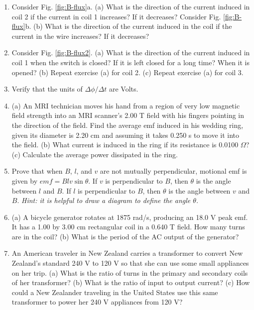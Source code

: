 \documentclass[12pt,twocolumn]{article}
\begin{document}
\noindent
\begin{enumerate}
\item Consider Fig. \ref{fig:B-flux}a.  (a) What is the direction of the current induced in coil 2 if the current in coil 1 increases? If it decreases?  Consider Fig. \ref{fig:B-flux}b.  (b) What is the direction of the current induced in the coil if the current in the wire increases?  If it decreases? \\ \vspace{3cm}
\item Consider Fig. \ref{fig:B-flux2}.  (a) What is the direction of the current induced in coil 1 when the switch is closed?  If it is left closed for a long time?  When it is opened?  (b) Repeat exercise (a) for coil 2.  (c) Repeat exercise (a) for coil 3. \\ \vspace{3cm}
\item Verify that the units of $\Delta\phi/\Delta t$ are Volts. \\ \vspace{3cm}
\item (a) An MRI technician moves his hand from a region of very low magnetic field strength into an MRI scanner's 2.00 T field with his fingers pointing in the direction of the field. Find the average emf induced in his wedding ring, given its diameter is 2.20 cm and assuming it takes 0.250 s to move it into the field. (b) What current is induced in the ring if its resistance is 0.0100 $\Omega$?  (c) Calculate the average power dissipated in the ring. \\ \vspace{4cm}
\clearpage
\item Prove that when $B$, $l$, and $v$ are not mutually perpendicular, motional emf is given by $emf = Blv\sin\theta$. If $v$ is perpendicular to $B$, then $\theta$ is the angle between $l$ and $B$. If $l$ is perpendicular to $B$, then $\theta$ is the angle between $v$ and $B$. \textit{Hint: it is helpful to draw a diagram to define the angle $\theta$.}\\ \vspace{6cm}
\item (a) A bicycle generator rotates at 1875 rad/s, producing an 18.0 V peak emf. It has a 1.00 by 3.00 cm rectangular coil in a 0.640 T field. How many turns are in the coil? (b) What is the period of the AC output of the generator?  \\ \vspace{3cm}
\item An American traveler in New Zealand carries a transformer to convert New Zealand's standard 240 V to 120 V so that she can use some small appliances on her trip. (a) What is the ratio of turns in the primary and secondary coils of her transformer? (b) What is the ratio of input to output current? (c) How could a New Zealander traveling in the United States use this same transformer to power her 240 V appliances from 120 V? \\ \vspace{3cm}

\end{enumerate}
\end{document}
